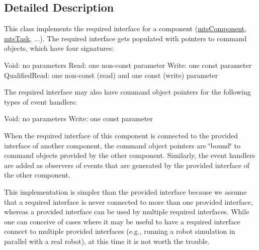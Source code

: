 \subsection{Detailed Description}
This class implements the required interface for a component (\hyperlink{classmts_component}{mts\-Component}, \hyperlink{classmts_task}{mts\-Task}, ...). The required interface gets populated with pointers to command objects, which have four signatures\-:

Void\-: no parameters Read\-: one non-\/const parameter Write\-: one const parameter Qualified\-Read\-: one non-\/const (read) and one const (write) parameter

The required interface may also have command object pointers for the following types of event handlers\-:

Void\-: no parameters Write\-: one const parameter

When the required interface of this component is connected to the provided interface of another component, the command object pointers are \char`\"{}bound\char`\"{} to command objects provided by the other component. Similarly, the event handlers are added as observers of events that are generated by the provided interface of the other component.

This implementation is simpler than the provided interface because we assume that a required interface is never connected to more than one provided interface, whereas a provided interface can be used by multiple required interfaces. While one can conceive of cases where it may be useful to have a required interface connect to multiple provided interfaces (e.\-g., running a robot simulation in parallel with a real robot), at this time it is not worth the trouble. 

